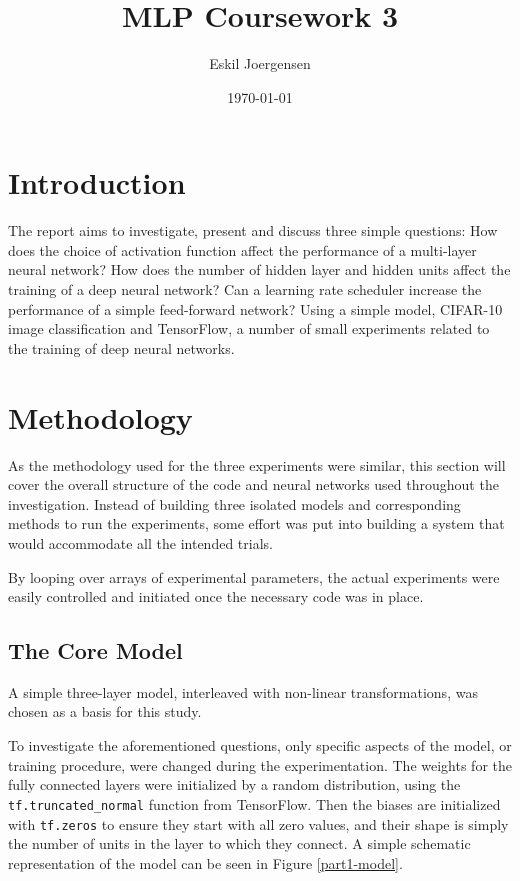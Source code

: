 \documentclass[]{article}
\title{MLP Coursework 3}
\author{Eskil Joergensen}
\date{\today}
\begin{document}
\maketitle

\section{Introduction}


The report aims to investigate, present and discuss three simple questions:
How does the choice of activation function affect the performance of a multi-layer neural network? How does the number of hidden layer and hidden units affect the training of a deep neural network? Can a learning rate scheduler increase the performance of a simple feed-forward network? Using a simple model, CIFAR-10 image classification and TensorFlow, a number of small experiments related to the training of deep neural networks.


\section{Methodology}

As the methodology used for the three experiments were similar, this section will cover the overall structure of the code and neural networks used throughout the investigation. Instead of building three isolated models and corresponding methods to run the experiments, some effort was put into building a system that would accommodate all the intended trials. 

By looping over arrays of experimental parameters, the actual experiments were easily controlled and initiated once the necessary code was in place. 

\subsection{The Core Model}

A simple three-layer model, interleaved with non-linear transformations, was chosen as a basis for this study. 

To investigate the aforementioned questions, only specific aspects of the model, or training procedure, were changed during the experimentation. The weights for the fully connected layers were initialized by a random distribution, using the \texttt{tf.truncated\_normal} function from TensorFlow. Then the biases are initialized with \texttt{tf.zeros} to ensure they start with all zero values, and their shape is simply the number of units in the layer to which they connect. A simple schematic representation of the model can be seen in Figure \ref{part1-model}.
\end{document}
